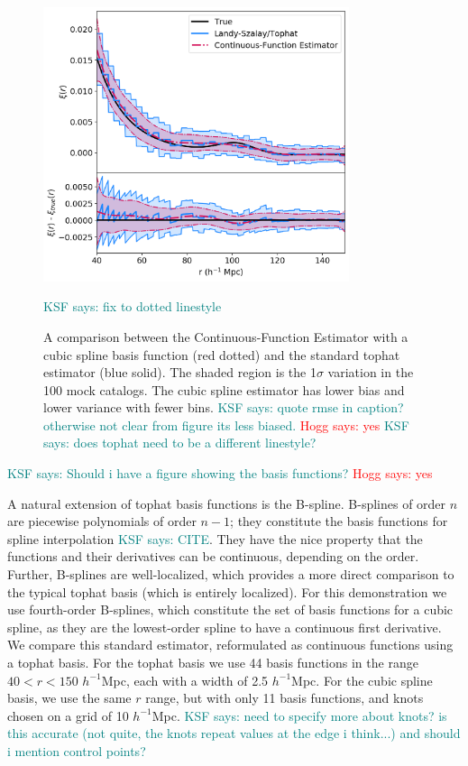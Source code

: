 \documentclass[modern]{aastex62}
\newcommand{\est}{the Continuous-Function Estimator\xspace}
\newcommand{\hmpc}{$h^{-1}$Mpc}
\newcommand{\KSF}[1]{\textcolor{teal}{KSF says: #1}}
\newcommand{\hogg}[1]{\textcolor{red}{Hogg says: #1}}
\begin{document}
\label{fig:spline}
\begin{figure}[ht]
\centering
    \includegraphics[width=0.8\textwidth]{tophat_cubic}
    \caption{A comparison between \est with a cubic spline basis function (red dotted) and the standard tophat estimator (blue solid). The shaded region is the 1$\sigma$ variation in the 100 mock catalogs. The cubic spline estimator has lower bias and lower variance with fewer bins. \KSF{quote rmse in caption? otherwise not clear from figure its less biased.} \hogg{yes} \KSF{does tophat need to be a different linestyle?}} \KSF{fix to dotted linestyle}

\end{figure}

\KSF{Should i have a figure showing the basis functions?} \hogg{yes}

A natural extension of tophat basis functions is the B-spline.
B-splines of order $n$ are piecewise polynomials of order $n-1$; they constitute the basis functions for spline interpolation \KSF{CITE}.
They have the nice property that the functions and their derivatives can be continuous, depending on the order.
Further, B-splines are well-localized, which provides a more direct comparison to the typical tophat basis (which is entirely localized).
For this demonstration we use fourth-order B-splines, which constitute the set of basis functions for a cubic spline, as they are the lowest-order spline to have a continuous first derivative.
We compare this standard estimator, reformulated as continuous functions using a tophat basis.
For the tophat basis we use 44 basis functions in the range $40 < r < 150$ \hmpc, each with a width of 2.5 \hmpc. 
For the cubic spline basis, we use the same $r$ range, but with only 11 basis functions, and knots chosen on a grid of 10 \hmpc.
\KSF{need to specify more about knots? is this accurate (not quite, the knots repeat values at the edge i think...) and should i mention control points?}
\end{document}
